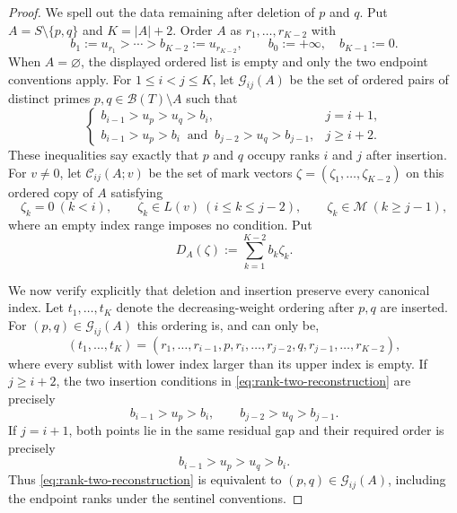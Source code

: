 \documentclass[11pt]{article}
\numberwithin{equation}{section}
\theoremstyle{plain}
\newcommand{\1}{\mathbf 1}
\newcommand{\cB}{\mathcal B}
\newcommand{\cM}{\mathcal M}
\begin{document}
\begin{proof}
We spell out the data remaining after deletion of $p$ and $q$.  Put
$A=S\setminus\{p,q\}$ and $K=|A|+2$.  Order $A$ as
$r_1,\ldots,r_{K-2}$ with
\[
 b_1:=u_{r_1}>\cdots>b_{K-2}:=u_{r_{K-2}},
 \qquad b_0:=+\infty,\quad b_{K-1}:=0.
\]
When $A=\varnothing$, the displayed ordered list is empty and only the
two endpoint conventions apply.
For $1\le i<j\le K$, let $\mathcal G_{ij}(A)$ be the set of ordered pairs
of distinct primes $p,q\in\cB(T)\setminus A$ such that
\begin{equation}\label{eq:rank-two-gaps}
 \begin{cases}
 b_{i-1}>u_p>u_q>b_i, & j=i+1,\\
 b_{i-1}>u_p>b_i\ \text{ and }\
 b_{j-2}>u_q>b_{j-1}, & j\ge i+2.
 \end{cases}
\end{equation}
These inequalities say exactly that $p$ and $q$ occupy ranks $i$ and $j$
after insertion.  For $v\ne0$, let $\mathcal C_{ij}(A;v)$ be the set of
mark vectors $\zeta=(\zeta_1,\ldots,\zeta_{K-2})$ on this ordered copy of
$A$ satisfying
\begin{equation}\label{eq:rank-two-residual-marks}
 \zeta_k=0\ (k<i),\qquad
 \zeta_k\in L(v)\ (i\le k\le j-2),\qquad
 \zeta_k\in\cM\ (k\ge j-1),
\end{equation}
where an empty index range imposes no condition.  Put
\[
 D_A(\zeta):=\sum_{k=1}^{K-2}b_k\zeta_k.
\]

We now verify explicitly that deletion and insertion preserve every
canonical index.  Let $t_1,\ldots,t_K$ denote the decreasing-weight
ordering after $p,q$ are inserted.  For
$(p,q)\in\mathcal G_{ij}(A)$ this ordering is, and can only be,
\begin{equation}\label{eq:rank-two-reconstruction}
 (t_1,\ldots,t_K)=
 (r_1,\ldots,r_{i-1},p,r_i,\ldots,r_{j-2},q,
  r_{j-1},\ldots,r_{K-2}),
\end{equation}
where every sublist with lower index larger than its upper index is empty.
If $j\ge i+2$, the two insertion conditions in
\eqref{eq:rank-two-reconstruction} are precisely
\[
 b_{i-1}>u_p>b_i,\qquad b_{j-2}>u_q>b_{j-1}.
\]
If $j=i+1$, both points lie in the same residual gap and their required
order is precisely
\[
 b_{i-1}>u_p>u_q>b_i.
\]
Thus \eqref{eq:rank-two-reconstruction} is equivalent to
$(p,q)\in\mathcal G_{ij}(A)$, including the endpoint ranks under the
sentinel conventions.


\end{proof}
\end{document}
